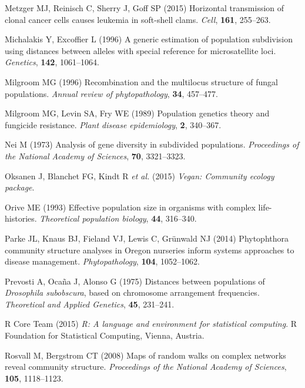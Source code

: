 \documentclass[double,12pt]{beavtex}
\begin{document}
  \hypertarget{ref-metzger2015horizontal}{}
  Metzger MJ, Reinisch C, Sherry J, Goff SP (2015) Horizontal transmission
  of clonal cancer cells causes leukemia in soft-shell clams. \emph{Cell},
  \textbf{161}, 255--263.
  
  \hypertarget{ref-michalakis1996generic}{}
  Michalakis Y, Excoffier L (1996) A generic estimation of population
  subdivision using distances between alleles with special reference for
  microsatellite loci. \emph{Genetics}, \textbf{142}, 1061--1064.
  
  \hypertarget{ref-milgroom1996recombination}{}
  Milgroom MG (1996) Recombination and the multilocus structure of fungal
  populations. \emph{Annual review of phytopathology}, \textbf{34},
  457--477.
  
  \hypertarget{ref-milgroom1989population}{}
  Milgroom MG, Levin SA, Fry WE (1989) Population genetics theory and
  fungicide resistance. \emph{Plant disease epidemiology}, \textbf{2},
  340--367.
  
  \hypertarget{ref-nei1973analysis}{}
  Nei M (1973) Analysis of gene diversity in subdivided populations.
  \emph{Proceedings of the National Academy of Sciences}, \textbf{70},
  3321--3323.
  
  \hypertarget{ref-oksanen2015vegan}{}
  Oksanen J, Blanchet FG, Kindt R \emph{et al.} (2015) \emph{Vegan:
  Community ecology package}.
  
  \hypertarget{ref-orive1993effective}{}
  Orive ME (1993) Effective population size in organisms with complex
  life-histories. \emph{Theoretical population biology}, \textbf{44},
  316--340.
  
  \hypertarget{ref-parke2014phytophthora}{}
  Parke JL, Knaus BJ, Fieland VJ, Lewis C, Grünwald NJ (2014) Phytophthora
  community structure analyses in Oregon nurseries inform systems
  approaches to disease management. \emph{Phytopathology}, \textbf{104},
  1052--1062.
  
  \hypertarget{ref-prevosti1975distances}{}
  Prevosti A, Ocaña J, Alonso G (1975) Distances between populations of
  \emph{Drosophila subobscura}, based on chromosome arrangement
  frequencies. \emph{Theoretical and Applied Genetics}, \textbf{45},
  231--241.
  
  \hypertarget{ref-R}{}
  R Core Team (2015) \emph{R: A language and environment for statistical
  computing}. R Foundation for Statistical Computing, Vienna, Austria.
  
  \hypertarget{ref-rosvall2008maps}{}
  Rosvall M, Bergstrom CT (2008) Maps of random walks on complex networks
  reveal community structure. \emph{Proceedings of the National Academy of
  Sciences}, \textbf{105}, 1118--1123.
  
\end{document}
